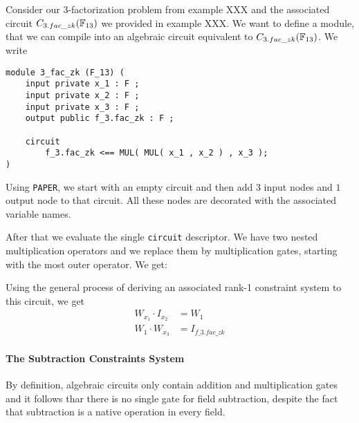 \begin{example}[$3$-factorization] Consider our $3$-factorization problem from example XXX and the associated circuit $C_{3.fac\_zk}(\mathbb{F}_{13})$ we provided in example XXX. We want to define a module, that we can compile into an algebraic circuit equivalent to $C_{3.fac\_zk}(\mathbb{F}_{13})$. We write
\begin{lstlisting}
module 3_fac_zk (F_13) (
	input private x_1 : F ; 
	input private x_2 : F ;
	input private x_3 : F ;  
	output public f_3.fac_zk : F ; 

	circuit
		f_3.fac_zk <== MUL( MUL( x_1 , x_2 ) , x_3 );
)
\end{lstlisting} 
Using \texttt{PAPER}, we start with an empty circuit and then add $3$ input nodes and $1$ output node to that circuit. All these nodes are decorated with the associated variable names. 

After that we evaluate the single \texttt{circuit} descriptor. We have two nested multiplication operators and we replace them by multiplication gates, starting with the most outer operator. We get: 
\begin{center}
\end{center} 
Using the general process of deriving an associated rank-1 constraint system to this circuit, we get
\begin{align*}
W_{x_1} \cdot I_{x_2} &= W_{1} \\
W_{1} \cdot W_{x_3}   &= I_{f\_3.fac\_zk}
\end{align*}
\end{example}
\paragraph{The Subtraction Constraints System} By definition, algebraic circuits only contain addition and multiplication gates and it follows thar there is no single gate for field subtraction, despite the fact that subtraction is a native operation in every field.


